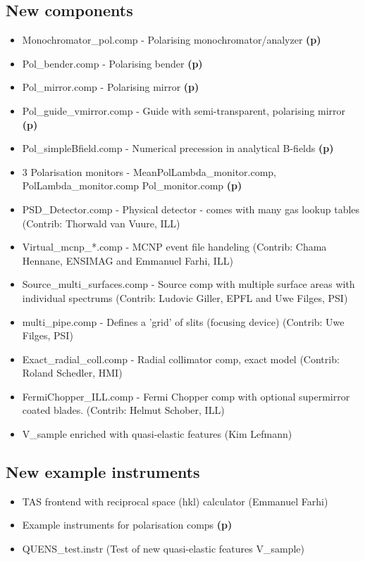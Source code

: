 \subsection{New components}
\begin{itemize}
\item Monochromator\_pol.comp - Polarising monochromator/analyzer {\bf(p)}
\item Pol\_bender.comp - Polarising bender {\bf(p)}
\item Pol\_mirror.comp - Polarising mirror {\bf(p)}
\item Pol\_guide\_vmirror.comp - Guide with semi-transparent, polarising mirror {\bf(p)}
\item Pol\_simpleBfield.comp - Numerical precession in analytical B-fields {\bf(p)}
\item 3 Polarisation monitors - MeanPolLambda\_monitor.comp, PolLambda\_monitor.comp
    Pol\_monitor.comp {\bf(p)}
\item PSD\_Detector.comp - Physical detector - comes with many gas lookup tables 
    (Contrib: Thorwald van Vuure, ILL)
\item Virtual\_mcnp\_*.comp - MCNP event file handeling
    (Contrib: Chama Hennane, ENSIMAG and Emmanuel Farhi, ILL) 
\item Source\_multi\_surfaces.comp - Source comp with multiple surface areas with individual
    spectrums (Contrib: Ludovic Giller, EPFL and Uwe Filges, PSI)
\item multi\_pipe.comp - Defines a 'grid' of slits (focusing device)
    (Contrib: Uwe Filges, PSI)
\item Exact\_radial\_coll.comp - Radial collimator comp, exact model
    (Contrib: Roland Schedler, HMI)
\item FermiChopper\_ILL.comp  - Fermi Chopper comp with optional
  supermirror coated blades. (Contrib: Helmut Schober, ILL)
\item V\_sample enriched with quasi-elastic features (Kim Lefmann)
\end{itemize}
\subsection{New example instruments}
\begin{itemize}
\item TAS frontend with reciprocal space (hkl) calculator (Emmanuel Farhi)
\item Example instruments for polarisation comps {\bf(p)}
\item QUENS\_test.instr (Test of new quasi-elastic features V\_sample)
\end{itemize}
